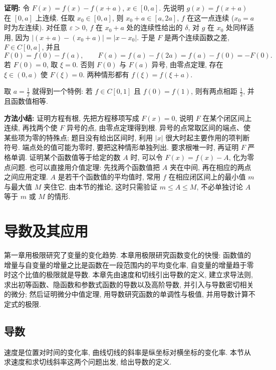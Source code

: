 \documentclass[UTF8,openany]{ctexbook}
\theoremstyle{chinesetextbook}
\newenvironment{cnproof}{\par\indent\textbf{证明:} \ignorespaces}{\par}
\begin{document}
\begin{cnproof}
令 $F(x)=f(x)-f(x+a)$, $x\in[0,a]$. 先说明 $g(x)=f(x+a)$ 在 $[0,a]$ 上连续. 任取 $x_0\in[0,a]$, 则 $x_0+a\in[a,2a]$, $f$ 在这一点连续 ($x_0=a$ 时为左连续). 对任意 $\varepsilon>0$, $f$ 在 $x_0+a$ 处的连续性给出的 $\delta$, 对 $g$ 在 $x_0$ 处同样适用, 因为 $|(x+a)-(x_0+a)|=|x-x_0|$. 于是 $F$ 是两个连续函数之差, $F\in C[0,a]$, 并且
\[
F(0)=f(0)-f(a),\qquad F(a)=f(a)-f(2a)=f(a)-f(0)=-F(0).
\]
若 $F(0)=0$, 取 $\xi=0$. 否则 $F(0)$ 与 $F(a)$ 异号, 由零点定理, 存在 $\xi\in(0,a)$ 使 $F(\xi)=0$. 两种情形都有 $f(\xi)=f(\xi+a)$.
\end{cnproof}
取 $\displaystyle a=\frac12$ 就得到一个特例: 若 $f\in C[0,1]$ 且 $f(0)=f(1)$, 则有两点相距 $\displaystyle\frac12$, 并且函数值相等.

\par\indent\textbf{方法小结:} 证明方程有根, 先把方程移项写成 $F(x)=0$, 说明 $F$ 在某个闭区间上连续, 再找两个使 $F$ 异号的点, 由零点定理得到根. 异号的点常取区间的端点、使某些项为零的特殊点; 题目没有给出区间时, 利用 $|x|$ 很大时起主要作用的项判断符号. 端点处的值可能为零时, 要把这种情形单独列出. 要求根唯一时, 再证明 $F$ 严格单调. 证明某个函数值等于给定的数 $A$ 时, 可以令 $F(x)=f(x)-A$, 化为零点问题. 也可以直接用介值定理: 先找两个函数值把 $A$ 夹在中间, 再在相应的两点之间应用定理. $A$ 是若干个函数值的平均值时, 常用 $f$ 在相应闭区间上的最小值 $m$ 与最大值 $M$ 夹住它. 由本节的推论, 这时只需验证 $m\le A\le M$, 不必单独讨论 $A$ 等于 $m$ 或 $M$ 的情形.
\chapter{导数及其应用}
第一章用极限研究了变量的变化趋势. 本章用极限研究函数变化的快慢: 函数值的增量与自变量的增量之比是函数在一段范围内的平均变化率, 自变量的增量趋于零时这个比值的极限就是导数. 本章先由速度和切线引出导数的定义, 建立求导法则, 求出初等函数、隐函数和参数式函数的导数以及高阶导数, 并引入与导数密切相关的微分; 然后证明微分中值定理, 用导数研究函数的单调性与极值, 并用导数计算不定式的极限.
\section{导数}
速度是位置对时间的变化率, 曲线切线的斜率是纵坐标对横坐标的变化率. 本节从求速度和求切线斜率这两个问题出发, 给出导数的定义.
\end{document}
